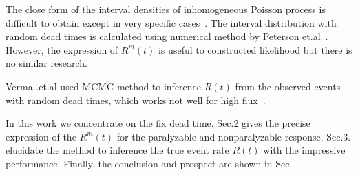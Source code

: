 The close form of the interval densities of inhomogeneous Poisson process is difficult to obtain except in very specific cases~\cite{Picinbono:2009output}. The interval distribution with random dead times is calculated using numerical method by Peterson et.al~\cite{Peterson:2021numerical}. However, the expression of $R^m(t)$ is useful to constructed likelihood but there is no similar research.

Verma .et.al used MCMC method to inference $R(t)$ from the observed events with random dead times, which works not well for high flux~\cite{Verma:2017inhomogeneous}.


In this work we concentrate on the fix dead time. Sec.2 gives the precise expression of the $R^m(t)$ for the paralyzable and nonparalyzable response. Sec.3. elucidate the method to inference the true event rate $R(t)$ with the impressive performance. Finally, the conclusion and prospect are shown in Sec.
